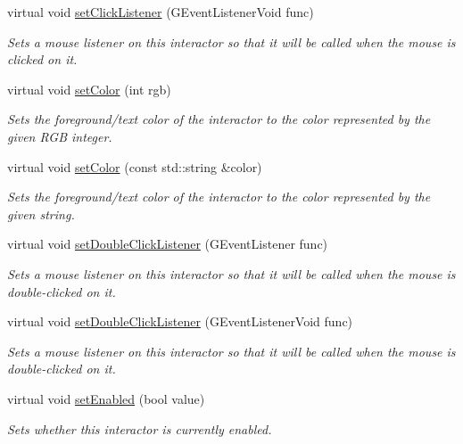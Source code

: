 \begin{DoxyCompactItemize}
virtual void \mbox{\hyperlink{classGInteractor_a856414c92df90f56f3877475eb3f8fc4}{set\+Click\+Listener}} (G\+Event\+Listener\+Void func)
\begin{DoxyCompactList}\small\item\em Sets a mouse listener on this interactor so that it will be called when the mouse is clicked on it. \end{DoxyCompactList}\item 
virtual void \mbox{\hyperlink{classGInteractor_ab1f5cc0f5cc6bbbd716a526c61f1081d}{set\+Color}} (int rgb)
\begin{DoxyCompactList}\small\item\em Sets the foreground/text color of the interactor to the color represented by the given R\+GB integer. \end{DoxyCompactList}\item 
virtual void \mbox{\hyperlink{classGInteractor_a61374df6c11b52cfbb0815decdbaebc6}{set\+Color}} (const std\+::string \&color)
\begin{DoxyCompactList}\small\item\em Sets the foreground/text color of the interactor to the color represented by the given string. \end{DoxyCompactList}\item 
virtual void \mbox{\hyperlink{classGInteractor_ac29f9a3462458e165fae3a1f046ee77a}{set\+Double\+Click\+Listener}} (G\+Event\+Listener func)
\begin{DoxyCompactList}\small\item\em Sets a mouse listener on this interactor so that it will be called when the mouse is double-\/clicked on it. \end{DoxyCompactList}\item 
virtual void \mbox{\hyperlink{classGInteractor_a50096194d66f48c92dd4c512d41bfc76}{set\+Double\+Click\+Listener}} (G\+Event\+Listener\+Void func)
\begin{DoxyCompactList}\small\item\em Sets a mouse listener on this interactor so that it will be called when the mouse is double-\/clicked on it. \end{DoxyCompactList}\item 
virtual void \mbox{\hyperlink{classGInteractor_ab831367dd84bbd579e02e55bacb21343}{set\+Enabled}} (bool value)
\begin{DoxyCompactList}\small\item\em Sets whether this interactor is currently enabled. \end{DoxyCompactList}\item 

\end{DoxyCompactItemize}
